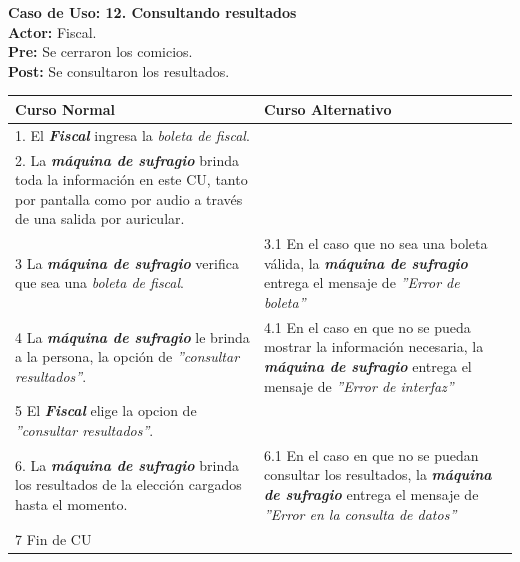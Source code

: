\documentclass[spanish, 10pt,a4paper]{article}
\numberwithin{equation}{section} %
\begin{document}
\newpage
\noindent\textbf{Caso de Uso: 12. Consultando resultados}\\
\textbf{Actor: } Fiscal.\\
\textbf{Pre: } Se cerraron los comicios.\\
\textbf{Post: } Se consultaron los resultados.\\
\begin{table}[H]
  \centering
\bgroup
\def\arraystretch{1.3}
  \begin{tabular}{p{9cm} | p{7cm}}
    \hline
    Curso Normal & Curso Alternativo \\
    \hline
    \hline    
    1. El \textbf{\textit{Fiscal}} ingresa la \textit{boleta de fiscal}. 
    & \\
    
    \hline
    2. La \textbf{\textit{máquina de sufragio}} brinda toda la información en este CU, tanto por pantalla como por audio a través de una salida por auricular.
    &
    \\
    
    \hline
    3 La \textbf{\textit{máquina de sufragio}} verifica que sea una \textit{boleta de fiscal}.
    & 
    3.1 En el caso que no sea una boleta válida, la \textbf{\textit{máquina de sufragio}} entrega el mensaje de \textit{''Error de boleta''}
    \\
    
    \hline
    4 La \textbf{\textit{máquina de sufragio}} le brinda a la persona, la opción de \textit{''consultar resultados''}.
    & 
    4.1 En el caso en que no se pueda mostrar la información necesaria, la \textbf{\textit{máquina de sufragio}} entrega el mensaje de \textit{''Error de interfaz''}
    \\
    
    \hline
    5 El \textbf{\textit{Fiscal}} elige la opcion de \textit{''consultar resultados''}.
    & \\
    
    \hline
    6. La \textbf{\textit{máquina de sufragio}} brinda los resultados de la elección cargados hasta el momento.
    &
    6.1 En el caso en que no se puedan consultar los resultados, la \textbf{\textit{máquina de sufragio}} entrega el mensaje de \textit{''Error en la consulta de datos''}
    \\
    
    \hline
    7 Fin de CU
    & \\
    \hline
  \end{tabular}
\egroup
\end{table}
\end{document}
